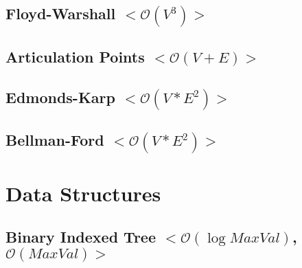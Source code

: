 \documentclass[10pt, a4paper, twoside, notitlepage]{article}
\begin{document}


\subsection{Floyd-Warshall $<\mathcal{O}(V^{3})>$}



\newpage

\subsection{Articulation Points $<\mathcal{O}(V+E)>$}



\newpage

\subsection{Edmonds-Karp $<\mathcal{O}(V*E^{2})>$}



\newpage

\subsection{Bellman-Ford $<\mathcal{O}(V*E^{2})>$}



\newpage

\section{Data Structures}

\subsection{Binary Indexed Tree $<\mathcal{O}(\log MaxVal)$, $\mathcal{O}(MaxVal)>$}



\newpage
\end{document}
